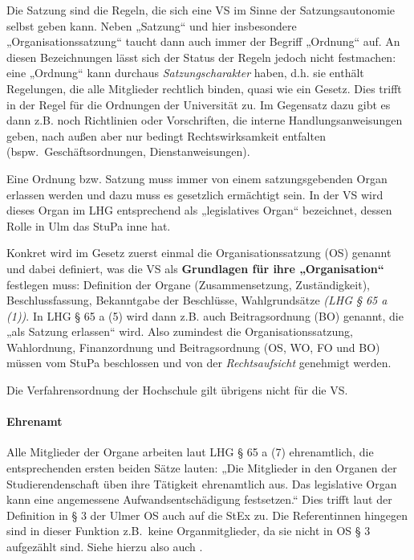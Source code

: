 \documentclass[
10pt,
a4paper,
twoside,								%
titlepage=false,							%
draft=false								%
]{scrartcl}
\begin{document}
Die Satzung sind die Regeln, die sich eine VS im Sinne der Satzungsautonomie selbst geben kann. Neben „Satzung“ und hier insbesondere „Organisationssatzung“ taucht dann auch immer der Begriff „Ordnung“ auf. An diesen Bezeichnungen lässt sich der Status der Regeln jedoch nicht festmachen: eine „Ordnung“ kann durchaus \emph{Satzungscharakter} haben, d.h. sie enthält Regelungen, die alle Mitglieder rechtlich binden, quasi wie ein Gesetz. Dies trifft in der Regel für die Ordnungen der Universität zu. Im Gegensatz dazu gibt es dann z.B. noch Richtlinien oder Vorschriften, die interne Handlungsanweisungen geben, nach außen aber nur bedingt Rechtswirksamkeit entfalten (bspw.~Geschäftsordnungen, Dienstanweisungen).

Eine Ordnung bzw. Satzung muss immer von einem satzungsgebenden Organ erlassen werden und dazu muss es gesetzlich ermächtigt sein. In der VS wird dieses Organ im LHG entsprechend als „legislatives Organ“ bezeichnet, dessen Rolle in Ulm das StuPa inne hat.


Konkret wird im Gesetz zuerst einmal die Organisationssatzung (OS) genannt und dabei definiert, was die VS als \textbf{Grundlagen für ihre „Organisation“} festlegen muss: Definition der Organe (Zusammensetzung, Zuständigkeit), Beschlussfassung, Bekanntgabe der Beschlüsse, Wahlgrundsätze \textit{(LHG § 65 a (1))}. In LHG § 65 a (5) wird dann z.B. auch Beitragsordnung (BO) genannt, die „als Satzung erlassen“ wird. Also zumindest die Organisationssatzung, Wahlordnung, Finanzordnung und Beitragsordnung (OS, WO, FO und BO) müssen vom StuPa beschlossen und von der \emph{Rechtsaufsicht} genehmigt werden.

Die Verfahrensordnung der Hochschule gilt übrigens nicht für die VS.


\paragraph{Ehrenamt}\label{Glossar: Ehrenamt}

Alle Mitglieder der Organe arbeiten laut LHG § 65 a (7) ehrenamtlich, die entsprechenden ersten beiden Sätze lauten: „Die Mitglieder in den Organen der Studierendenschaft üben ihre Tätigkeit ehrenamtlich aus. Das legislative Organ kann eine angemessene Aufwandsentschädigung festsetzen.“ Dies trifft laut der Definition in § 3 der Ulmer OS auch auf die StEx zu. Die Referentinnen hingegen sind in dieser Funktion z.B.~keine Organmitglieder, da sie nicht in OS § 3 aufgezählt sind. Siehe hierzu also auch .
\end{document}
